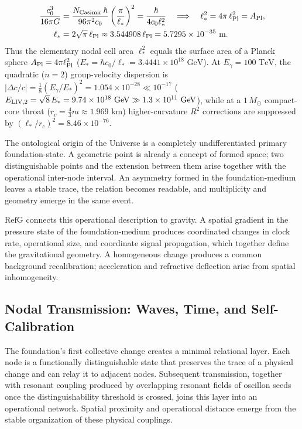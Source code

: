 \documentclass[11pt,a4paper]{article}
\newcommand{\RefG}{\mathrm{RefG}}
\begin{document}
\begin{enumerate}[label=\arabic*.]
\begin{equation}
\begin{aligned}
\frac{c_0^3}{16\pi G} &= \frac{N_{\rm Casimir}\,\hbar}{96\pi^2 c_0}\left(\frac{\pi}{\ell_*}\right)^2 = \frac{\hbar}{4 c_0 \ell_*^2} \quad\Longrightarrow\quad \ell_*^2 = 4\pi\,\ell_{\rm Pl}^2 = A_{\rm Pl}, \\
\ell_* &= 2\sqrt{\pi}\,\ell_{\rm Pl} \approx 3.544908\,\ell_{\rm Pl} = 5.7295\times 10^{-35}\text{ m}.
\end{aligned}
\end{equation}
Thus the elementary nodal cell area $\ell_*^2$ equals the surface area of a Planck sphere $A_{\rm Pl} = 4\pi\ell_{\rm Pl}^2$ ($E_* = \hbar c_0/\ell_* = 3.4441\times 10^{18}\text{ GeV}$). At $E_\gamma = 100\text{ TeV}$, the quadratic ($n=2$) group-velocity dispersion is $|\Delta c/c| = \frac{1}{8}(E_\gamma/E_*)^2 = 1.054\times 10^{-28} \ll 10^{-17}$ ($E_{\rm LIV,2} = \sqrt{8}\,E_* = 9.74\times 10^{18}\text{ GeV} \gg 1.3\times 10^{11}\text{ GeV}$), while at a $1\,M_\odot$ compact-core throat ($r_c = \frac{4}{3}m \approx 1.969\text{ km}$) higher-curvature $R^2$ corrections are suppressed by $(\ell_*/r_c)^2 = 8.46\times 10^{-76}$.
\end{enumerate}

The ontological origin of the Universe is a completely undifferentiated primary foundation-state. A geometric point is already a concept of formed space; two distinguishable points and the extension between them arise together with the operational inter-node interval. An asymmetry formed in the foundation-medium leaves a stable trace, the relation becomes readable, and multiplicity and geometry emerge in the same event.

$\RefG$ connects this operational description to gravity. A spatial gradient in the pressure state of the foundation-medium produces coordinated changes in clock rate, operational size, and coordinate signal propagation, which together define the gravitational geometry. A homogeneous change produces a common background recalibration; acceleration and refractive deflection arise from spatial inhomogeneity.

\subsection{Nodal Transmission: Waves, Time, and Self-Calibration}

The foundation's first collective change creates a minimal relational layer. Each node is a functionally distinguishable state that preserves the trace of a physical change and can relay it to adjacent nodes. Subsequent transmission, together with resonant coupling produced by overlapping resonant fields of oscillon seeds once the distinguishability threshold is crossed, joins this layer into an operational network. Spatial proximity and operational distance emerge from the stable organization of these physical couplings.
\end{document}
